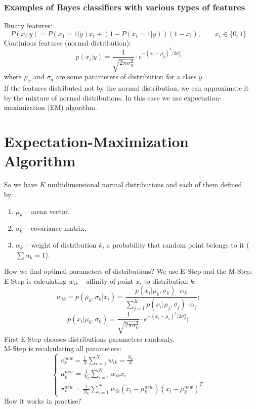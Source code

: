 \subsubsection*{Examples of Bayes classifiers with various types of features}

Binary features:
$$P(x_i|y)=P(x_1=1|y)x_i+(1-P(x_i=1|y))(1-x_i),\qquad x_i\in\{0,1\}$$
Continious features (normal distribution):
$$p(x_i|y)=\frac{1}{\sqrt{2\pi\sigma_y^2}}\cdot e^{-(x_i-\mu_y)^2/2\sigma_y^2}$$
where $\mu_y$ and $\sigma_y$ are some parameters of distribution for a class $y$. \\
If the features distributed not by the normal distribution, we can approximate it by the mixture of normal distributions. In this case we use expectation-maximization (EM) algorithm.

\section{Expectation-Maximization Algorithm}

So we have $K$ multidimensional normal distributions and each of them defined by:
\begin{enumerate}[label=$\bullet$]
	\item $\mu_k$ -- mean vector,
	\item $\sigma_k$ -- covariance matrix,
	\item $\alpha_k$ -- weight of distribution $k$, a probability that random point belongs to it ($\sum\alpha_k=1$).
\end{enumerate}
How we find optimal parameters of distributions? We use E-Step and the M-Step. E-Step is calculating $w_{ik}$ -- affinity of point $x_i$ to distribution $k$:
$$w_{ik} = p(\mu_k,\sigma_k|x_i)=\frac{p(x_i|\mu_k,\sigma_k)\cdot\alpha_k}{\sum\limits_{j=1}^{K}p(x_i|\mu_j,\sigma_j)\cdot\alpha_j};$$
$$p(x_i|\mu_k, \sigma_k)=\frac{1}{\sqrt{2\pi\sigma_k^2}}\cdot e^{-(x_i-\mu_k)^2/2\sigma_k^2};$$
First E-Step chooses distributions parameters randomly.\\
M-Step is recalculating all parameters:
$$\begin{cases}
	a_k^{new}=\frac{1}{N}\sum\limits_{i=1}^{N}w_{ik}=\frac{N_k}{N} \\
	\mu_k^{new}=\frac{1}{N_k}\sum\limits_{i=1}^{N}w_{ik}x_i \\
	\sigma_k^{new}=\frac{1}{N_k}\sum\limits_{i=1}^{N}w_{ik}(x_i-\mu_k^{new})(x_i-\mu_k^{new})^T
\end{cases}$$
How it works in practise?

